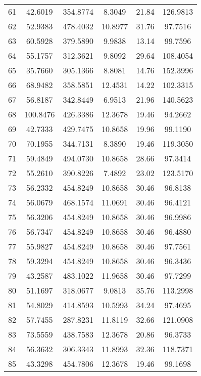 \begin{center}
\begin{footnotesize}
\begin{tabular}{|c|ccccc|}
61 & 42.6019 & 354.8774 & 8.3049 & 21.84 & 126.9813 \\
62 & 52.9383 & 478.4032 & 10.8977 & 31.76 & 97.7516 \\
63 & 60.5928 & 379.5890 & 9.9838 & 13.14 & 99.7596 \\
64 & 55.1757 & 312.3621 & 9.8092 & 29.64 & 108.4054 \\
65 & 35.7660 & 305.1366 & 8.8081 & 14.76 & 152.3996 \\
66 & 68.9482 & 358.5851 & 12.4531 & 14.22 & 102.3315 \\
67 & 56.8187 & 342.8449 & 6.9513 & 21.96 & 140.5623 \\
68 & 100.8476 & 426.3386 & 12.3678 & 19.46 & 94.2662 \\
69 & 42.7333 & 429.7475 & 10.8658 & 19.96 & 99.1190 \\
70 & 70.1955 & 344.7131 & 8.3890 & 19.46 & 119.3050 \\
71 & 59.4849 & 494.0730 & 10.8658 & 28.66 & 97.3414 \\
72 & 55.2610 & 390.8226 & 7.4892 & 23.02 & 123.5170 \\
73 & 56.2332 & 454.8249 & 10.8658 & 30.46 & 96.8138 \\
74 & 56.0679 & 468.1574 & 11.0691 & 30.46 & 96.4121 \\
75 & 56.3206 & 454.8249 & 10.8658 & 30.46 & 96.9986 \\
76 & 56.7347 & 454.8249 & 10.8658 & 30.46 & 96.4880 \\
77 & 55.9827 & 454.8249 & 10.8658 & 30.46 & 97.7561 \\
78 & 59.3294 & 454.8249 & 10.8658 & 30.46 & 96.3436 \\
79 & 43.2587 & 483.1022 & 11.9658 & 30.46 & 97.7299 \\
80 & 51.1697 & 318.0677 & 9.0813 & 35.76 & 113.2998 \\
81 & 54.8029 & 414.8593 & 10.5993 & 34.24 & 97.4695 \\
82 & 57.7455 & 287.8231 & 11.8119 & 32.66 & 121.0908 \\
83 & 73.5559 & 438.7583 & 12.3678 & 20.86 & 96.3733 \\
84 & 56.3632 & 306.3343 & 11.8993 & 32.36 & 118.7371 \\
85 & 43.3298 & 454.7806 & 12.3678 & 19.46 & 99.1698 \\
\hline
\end{tabular}
\end{footnotesize}
\end{center}

